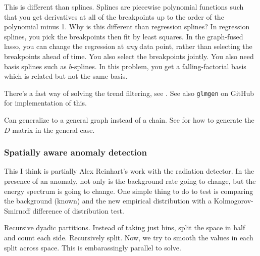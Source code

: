 \documentclass{article}
\begin{document}
This is different than splines. Splines are piecewise polynomial functions such that you get derivatives
at all of the breakpoints up to the order of the polynomial minus 1. Why is this different than regression splines?
In regression splines, you pick the breakpoints then fit by least squares. In the graph-fused lasso, you can change
the regression at \emph{any} data point, rather than selecting the breakpoints ahead of time. You also select the breakpoints jointly. You also need basis splines such as $b$-splines. In this problem, you get a falling-factorial basis which is related but not the same basis.

There's a fast way of solving the trend filtering, see \cite{ramdas2015fast}. See also \texttt{glmgen} on GitHub
for implementation of this.

Can generalize to a general graph instead of a chain. See \cite{wang2015trend} for how to generate the $D$ matrix
in the general case.

\subsubsection{Spatially aware anomaly detection}
This I think is partially Alex Reinhart's work with the radiation detector. In the presence of an anomaly, not only
is the background rate going to change, but the energy spectrum is going to change. One simple thing
to do to test is comparing the background (known) and the new empirical distribution with a Kolmogorov-Smirnoff 
difference of distribution test. 

Recursive dyadic partitions. Instead of taking just bins, split the space in half and count each side. Recursively split.
Now, we try to smooth the values in each split across space. This is embarassingly parallel to solve.






\end{document}
